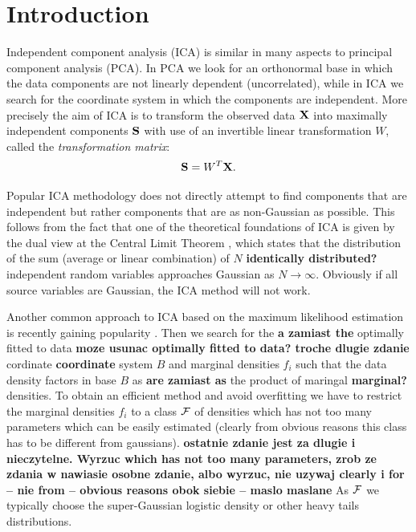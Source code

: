 \section{Introduction}
\label{introduction}

Independent component analysis (ICA) is similar in many aspects to principal component analysis (PCA). In PCA we look for an orthonormal base in which the data components are not
linearly dependent (uncorrelated), while in 
ICA we search for the coordinate system in which the components are independent. More precisely the aim of ICA is to transform the observed data $\X$ into maximally independent components $\S$ with use of an invertible linear transformation $W$, called the {\em transformation matrix}: $$
\S = W^T \X.
$$

Popular ICA methodology does not directly attempt to find components that are independent but rather components that are as non-Gaussian as possible.
This follows from the fact that one of the theoretical foundations of ICA is given by the dual view at the Central Limit Theorem \cite{hyvarinen2000independent}, which states that the distribution of the sum (average or linear combination) of $N$ \textbf{identically distributed?} independent random variables approaches Gaussian as  $N\rightarrow \infty$. Obviously if all source variables are Gaussian, the ICA method will not work. 

Another common approach to ICA based on the maximum likelihood estimation~\cite{pham1997blind} is recently gaining popularity \cite{hyvarinen2004independent,samworth2012independent,ICA2017pattern}.  Then we search for the \textbf{a zamiast the} optimally fitted to data \textbf{moze usunac optimally fitted to data? troche dlugie zdanie} cordinate \textbf{coordinate} system $B$ and marginal
densities $f_i$ such that the data density factors in base $B$ as \textbf{are zamiast as} the product of maringal \textbf{marginal?} densities. To obtain an efficient method and avoid 
overfitting we have to restrict the marginal densities $f_i$ to a class $\F$ of densities which has not too many parameters which can be easily estimated (clearly from obvious reasons this class has to be different from gaussians). \textbf{ostatnie zdanie jest za dlugie i nieczytelne. Wyrzuc which has not too many parameters, zrob ze zdania w nawiasie osobne zdanie, albo wyrzuc,
nie uzywaj clearly i for -- nie from -- obvious reasons obok siebie -- maslo maslane} As $\F$ we typically choose the super-Gaussian logistic density or other heavy tails distributions.

